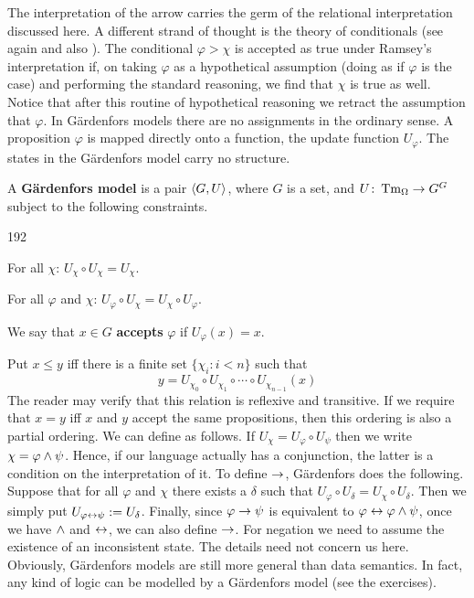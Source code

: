 The interpretation of the arrow carries the germ of the relational
interpretation discussed here. A different strand of thought is
the theory of conditionals (see again \cite{veltman:conditionals}
and also \cite{gaerdenfors:flux}). The conditional $\varphi >
\chi$ is accepted as true under Ramsey's interpretation 
if, on taking $\varphi$ as a hypothetical assumption (doing as if
$\varphi$ is the case) and performing the standard reasoning, we
find that $\chi$ is true as well. Notice that after this routine
of hypothetical reasoning we retract the assumption that
$\varphi$. In G\"ardenfors models there are no assignments in the
ordinary sense. A proposition $\varphi$ is mapped directly onto a
function, the update function $U_{\varphi}$. The states in the
G\"ardenfors model carry no structure.
\begin{defn}
A \textbf{G\"ardenfors model} is a pair $\langle G, U\rangle$, where
$G$ is a set, and $U \colon \operatorname{Tm}_{\Omega} \rightarrow G^G$ subject to the
following constraints.
\begin{dingautolist}{192}
\item For all $\chi$: $U_{\chi} \circ U_{\chi} = U_{\chi}$.
\item For all $\varphi$ and $\chi$:
    $U_{\varphi} \circ U_{\chi} = U_{\chi} \circ U_{\varphi}$.
\end{dingautolist}
We say that $x \in G$ \textbf{accepts} $\varphi$ if $U_{\varphi}(x) = x$.
\end{defn}
Put $x \leq y$ iff
there is a finite set $\{\chi_i : i < n\}$ such that 
\begin{equation}
y = U_{\chi_0} \circ U_{\chi_1} \circ \dotsb \circ U_{\chi_{n-1}}(x)
\end{equation}
The reader may verify that this relation is reflexive and transitive.
If we require that $x = y$ iff $x$ and $y$ accept the
same propositions, then this ordering is also a partial ordering.
We can define as follows. If $U_{\chi} = U_{\varphi} \circ
U_{\psi}$ then we write $\chi = \varphi\wedge\psi$. Hence, if our
language actually has a conjunction, the latter is a condition on
the interpretation of it. To define $\rightarrow$, G\"ardenfors does the
following. Suppose that for all $\varphi$ and $\chi$ there exists
a $\delta$ such that $U_{\varphi} \circ U_{\delta} = U_{\chi}
\circ U_{\delta}$. Then we simply put $U_{\varphi \leftrightarrow \psi}
:= U_{\delta}$. Finally, since $\varphi\rightarrow\psi$ is equivalent to
$\varphi\leftrightarrow \varphi\wedge \psi$, once we have $\wedge$ and $\leftrightarrow$, we
can also define $\rightarrow$. For negation we need to assume the
existence of an inconsistent state. The details need not concern
us here. Obviously, G\"ardenfors models are still more general
than data semantics. In fact, any kind of logic can be modelled by
a G\"ardenfors model (see the exercises).

